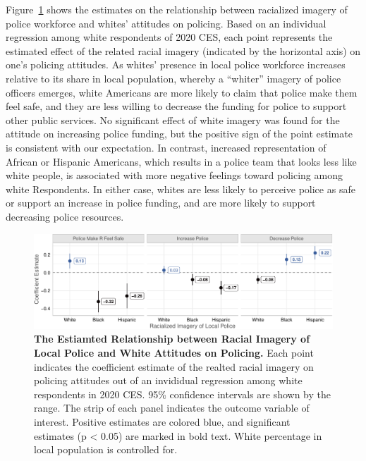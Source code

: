 \documentclass[
  12pt,
]{article}
\begin{document}
Figure~\ref{fig-baseline} shows the estimates on the relationship
between racialized imagery of police workforce and whites' attitudes on
policing. Based on an individual regression among white respondents of
2020 CES, each point represents the estimated effect of the related
racial imagery (indicated by the horizontal axis) on one's policing
attitudes. As whites' presence in local police workforce increases
relative to its share in local population, whereby a ``whiter'' imagery
of police officers emerges, white Americans are more likely to claim
that police make them feel safe, and they are less willing to decrease
the funding for police to support other public services. No significant
effect of white imagery was found for the attitude on increasing police
funding, but the positive sign of the point estimate is consistent with
our expectation. In contrast, increased representation of African or
Hispanic Americans, which results in a police team that looks less like
white people, is associated with more negative feelings toward policing
among white Respondents. In either case, whites are less likely to
perceive police as safe or support an increase in police funding, and
are more likely to support decreasing police resources.

\begin{figure}[tb]

{\centering \includegraphics{racialized-police_files/figure-pdf/fig-baseline-1.pdf}

}

\caption{\label{fig-baseline}\textbf{The Estiamted Relationship between
Racial Imagery of Local Police and White Attitudes on Policing.} Each
point indicates the coefficient estimate of the realted racial imagery
on policing attitudes out of an invididual regression among white
respondents in 2020 CES. 95\% confidence intervals are shown by the
range. The strip of each panel indicates the outcome variable of
interest. Positive estimates are colored blue, and significant estimates
(p \textless{} 0.05) are marked in bold text. White percentage in local
population is controlled for.}

\end{figure}
\end{document}
